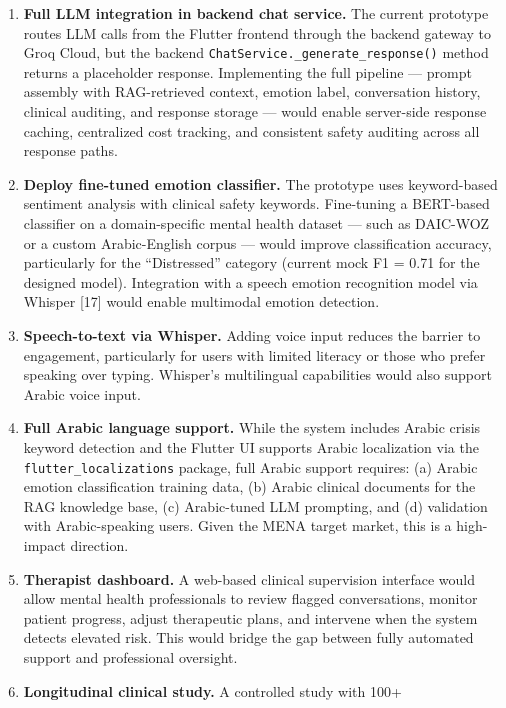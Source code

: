 \documentclass[
  letterpaper,
  12pt,
  a4paper,
  openany]{report}
\begin{document}
\begin{enumerate}
\def\labelenumi{\arabic{enumi}.}
\item
  \textbf{Full LLM integration in backend chat service.} The current
  prototype routes LLM calls from the Flutter frontend through the
  backend gateway to Groq Cloud, but the backend
  \texttt{ChatService.\_generate\_response()} method returns a
  placeholder response. Implementing the full pipeline --- prompt
  assembly with RAG-retrieved context, emotion label, conversation
  history, clinical auditing, and response storage --- would enable
  server-side response caching, centralized cost tracking, and
  consistent safety auditing across all response paths.
\item
  \textbf{Deploy fine-tuned emotion classifier.} The prototype uses
  keyword-based sentiment analysis with clinical safety keywords.
  Fine-tuning a BERT-based classifier on a domain-specific mental health
  dataset --- such as DAIC-WOZ or a custom Arabic-English corpus ---
  would improve classification accuracy, particularly for the
  ``Distressed'' category (current mock F1 = 0.71 for the designed
  model). Integration with a speech emotion recognition model via
  Whisper {[}17{]} would enable multimodal emotion detection.
\item
  \textbf{Speech-to-text via Whisper.} Adding voice input reduces the
  barrier to engagement, particularly for users with limited literacy or
  those who prefer speaking over typing. Whisper's multilingual
  capabilities would also support Arabic voice input.
\item
  \textbf{Full Arabic language support.} While the system includes
  Arabic crisis keyword detection and the Flutter UI supports Arabic
  localization via the \texttt{flutter\_localizations} package, full
  Arabic support requires: (a) Arabic emotion classification training
  data, (b) Arabic clinical documents for the RAG knowledge base, (c)
  Arabic-tuned LLM prompting, and (d) validation with Arabic-speaking
  users. Given the MENA target market, this is a high-impact direction.
\item
  \textbf{Therapist dashboard.} A web-based clinical supervision
  interface would allow mental health professionals to review flagged
  conversations, monitor patient progress, adjust therapeutic plans, and
  intervene when the system detects elevated risk. This would bridge the
  gap between fully automated support and professional oversight.
\item
  \textbf{Longitudinal clinical study.} A controlled study with 100+

\end{enumerate}
\end{document}
